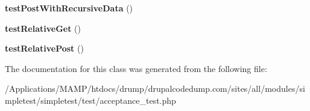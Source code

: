 \begin{DoxyCompactItemize}
\item 
\hypertarget{class_test_of_live_fetching_a3ce9d26f08d4f00292198340066b0e84}{
{\bfseries testPostWithRecursiveData} ()}
\label{class_test_of_live_fetching_a3ce9d26f08d4f00292198340066b0e84}

\item 
\hypertarget{class_test_of_live_fetching_a570717102fbfe02a93d5ce6a6daa9ea3}{
{\bfseries testRelativeGet} ()}
\label{class_test_of_live_fetching_a570717102fbfe02a93d5ce6a6daa9ea3}

\item 
\hypertarget{class_test_of_live_fetching_a992a142a548a591e3faffef8b9cb8c14}{
{\bfseries testRelativePost} ()}
\label{class_test_of_live_fetching_a992a142a548a591e3faffef8b9cb8c14}

\end{DoxyCompactItemize}


The documentation for this class was generated from the following file:\begin{DoxyCompactItemize}
\item 
/Applications/MAMP/htdocs/drump/drupalcodedump.com/sites/all/modules/simpletest/simpletest/test/acceptance\_\-test.php\end{DoxyCompactItemize}
